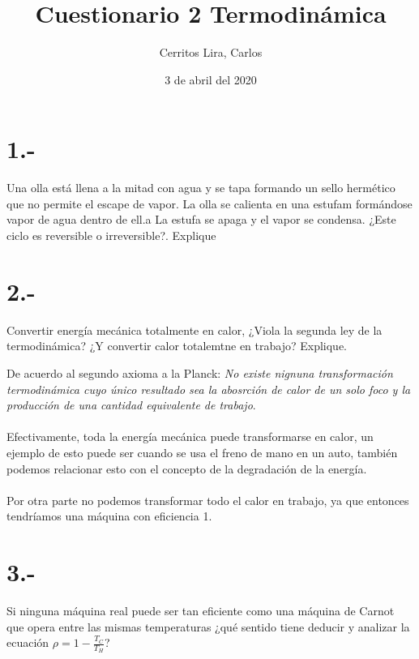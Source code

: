 \documentclass{article}
\title{Cuestionario 2 Termodinámica}
\author{Cerritos Lira, Carlos}
\date{3 de abril del 2020}
\begin{document}
\maketitle
\section*{1.-}
Una olla está llena a la mitad con agua y se tapa formando un sello
hermético que no permite el escape de vapor. La olla se calienta en una estufam 
formándose vapor de agua dentro de ell.a La estufa se apaga y el vapor se condensa. 
¿Este ciclo es reversible o irreversible?. Explique
\begin{tcolorbox}[breakable]

\end{tcolorbox}

\section*{2.-}
Convertir energía mecánica totalmente en calor, ¿Viola la segunda ley de la termodinámica?
¿Y convertir calor totalemtne en trabajo? Explique.
\begin{tcolorbox}[breakable]
    De acuerdo al segundo axioma a la Planck: \textit{No existe nignuna transformación termodinámica
    cuyo único resultado sea la abosrción de calor de un solo foco y la producción de una cantidad
    equivalente de trabajo}. \\ \\
    Efectivamente, toda la energía mecánica puede transformarse en calor, un ejemplo de esto puede ser cuando se 
    usa el freno de mano en un auto, también podemos relacionar esto con el concepto de la degradación de la energía. \\ \\
    Por otra parte no podemos transformar todo el calor en trabajo, ya que entonces tendríamos una 
    máquina con eficiencia 1.  
\end{tcolorbox}

\section*{3.-}
Si ninguna máquina real puede ser tan eficiente como una máquina de Carnot que opera entre las mismas 
temperaturas ¿qué sentido tiene deducir y analizar la ecuación $\rho = 1- \frac{T_C}{T_H}$?
\begin{tcolorbox}[breakable]

\end{tcolorbox}
\end{document}

